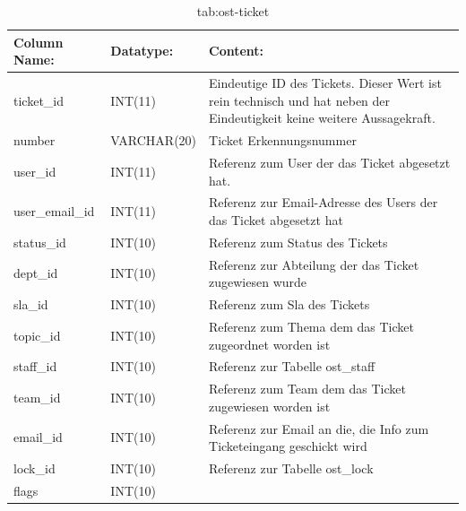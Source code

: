 \begin{table}[h]
	\begin{tabular}{|p{3.5cm}|p{4cm}|p{6.2cm}|}
		\hline
		\textbf{Column Name:} & \textbf{Datatype:} & \textbf{Content:}\\
		\hline
		ticket\_id & INT(11) & Eindeutige ID des Tickets. Dieser Wert ist rein technisch und hat  neben der Eindeutigkeit keine weitere 
		Aussagekraft.\\
		\hline
		number & VARCHAR(20) & Ticket Erkennungsnummer \\
		\hline
		user\_id & INT(11) & Referenz zum User der das Ticket abgesetzt hat.\\
		\hline
		user\_email\_id & INT(11) & Referenz zur Email-Adresse des Users der das Ticket abgesetzt hat\\
		\hline
		status\_id & INT(10) & Referenz zum Status des Tickets\\
		\hline
		dept\_id & INT(10) &  Referenz zur Abteilung der das Ticket zugewiesen wurde\\
		\hline
		sla\_id & INT(10) & Referenz zum Sla des Tickets\\
		\hline
		topic\_id & INT(10) & Referenz zum Thema dem das Ticket zugeordnet worden ist\\
		\hline
		staff\_id & INT(10) & Referenz zur Tabelle ost\_staff \\
		\hline
		team\_id & INT(10) & Referenz zum Team dem das Ticket zugewiesen worden ist \\
		\hline
		email\_id & INT(10) & Referenz zur Email an die, die Info zum Ticketeingang geschickt wird \\
		\hline
		lock\_id & INT(10) & Referenz zur Tabelle ost\_lock \\
		\hline
		flags & INT(10) &  \\
		\hline
	\end{tabular}
	\caption{tab:ost-ticket}
\end{table}
\label{tab:ost_ticket}
\newpage
